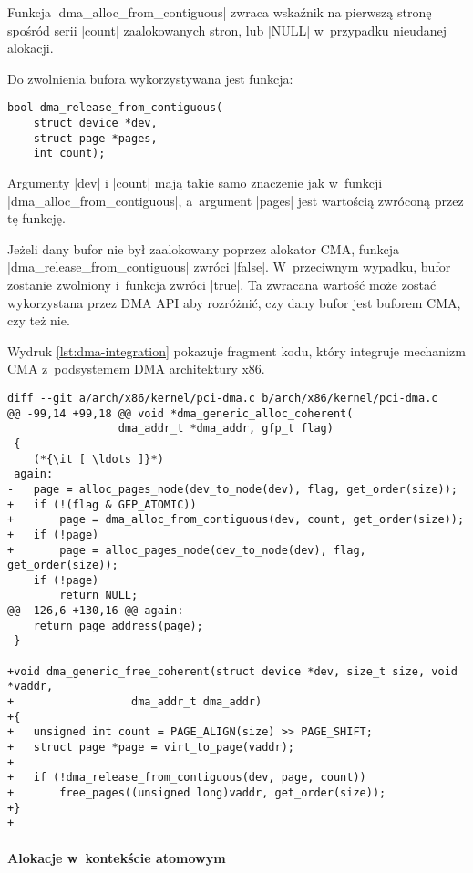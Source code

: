 Funkcja \code|dma_alloc_from_contiguous| zwraca wskaźnik na
pierwszą stronę spośród serii \code|count| zaalokowanych stron,
lub \code|NULL| w~przypadku nieudanej alokacji.

Do zwolnienia bufora wykorzystywana jest funkcja:

\begin{lstlisting}
bool dma_release_from_contiguous(
	struct device *dev,
	struct page *pages,
	int count);
\end{lstlisting}

Argumenty \code|dev| i \code|count| mają takie samo
znaczenie jak w~funkcji \code|dma_alloc_from_contiguous|,
a~argument \code|pages| jest wartością zwróconą przez tę funkcję.

Jeżeli dany bufor nie był zaalokowany poprzez alokator CMA, funkcja
\code|dma_release_from_contiguous| zwróci \code|false|.  W~przeciwnym
wypadku, bufor zostanie zwolniony i~funkcja zwróci \code|true|.  Ta
zwracana wartość może zostać wykorzystana przez DMA API aby rozróżnić,
czy dany bufor jest buforem CMA, czy też nie.

Wydruk \ref{lst:dma-integration} pokazuje fragment kodu, który
integruje mechanizm CMA z~podsystemem DMA architektury x86.

\begin{lstlisting}[float=bht,caption={Integracja alokatora CMA z~podsystemem DMA
      architektury x86.},label=lst:dma-integration]
diff --git a/arch/x86/kernel/pci-dma.c b/arch/x86/kernel/pci-dma.c
@@ -99,14 +99,18 @@ void *dma_generic_alloc_coherent(
 				 dma_addr_t *dma_addr, gfp_t flag)
 {
	(*{\it [ \ldots ]}*)
 again:
-	page = alloc_pages_node(dev_to_node(dev), flag, get_order(size));
+	if (!(flag & GFP_ATOMIC))
+		page = dma_alloc_from_contiguous(dev, count, get_order(size));
+	if (!page)
+		page = alloc_pages_node(dev_to_node(dev), flag, get_order(size));
 	if (!page)
 		return NULL;
@@ -126,6 +130,16 @@ again:
 	return page_address(page);
 }

+void dma_generic_free_coherent(struct device *dev, size_t size, void *vaddr,
+			       dma_addr_t dma_addr)
+{
+	unsigned int count = PAGE_ALIGN(size) >> PAGE_SHIFT;
+	struct page *page = virt_to_page(vaddr);
+
+	if (!dma_release_from_contiguous(dev, page, count))
+		free_pages((unsigned long)vaddr, get_order(size));
+}
+
\end{lstlisting}

\paragraph{Alokacje w~kontekście atomowym} \hspace{0pt} \\


